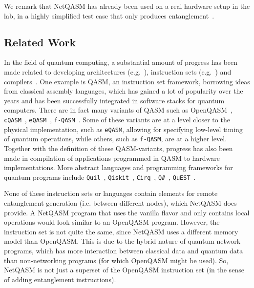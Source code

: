 We remark that \ac{NetQASM} has already been used on a real hardware setup in the lab, in a highly simplified test case that only produces entanglement~\cite{pompili2021experimental}.

\subsection{Related Work}
\label{sec:related}
In the field of quantum computing, a substantial amount of progress has been made related to developing
architectures (e.g.~\cite{fu2017microarchitecture,bourassa2020photonicblueprint, murali2019fullstack, wecker2014liqui, khammassi2020openql, amy2019staq, green2013quipper, Steiger2016}),
instruction sets (e.g.~\cite{cross2017openqasm,khammassi2018cqasm,fu2019eqasm,liu2017fqasm,smith2016quil,qiskit,cirq,qsharp,jones2019quest}) and
compilers~\cite{zulehner2019compiling, haner2018software, gokhale2020quantum, liu2020new, gokhale2020optimized, ding2020square, smith2020opensource, Sivarajah_2020, hietala2019verified, zhang2020contextmapping, niu2020hardware, dury2020qubo, pozzi2020using, Nishio_2020}.
One example is QASM, an instruction set framework, borrowing ideas from classical assembly languages, which has gained a lot of popularity over the years and has been successfully integrated in software stacks for quantum computers.
There are in fact many variants of QASM such as OpenQASM~\cite{cross2017openqasm}, \texttt{cQASM}~\cite{khammassi2018cqasm}, \texttt{eQASM}~\cite{fu2019eqasm}, \texttt{f-QASM}~\cite{liu2017fqasm}.
Some of these variants are at a level closer to the physical implementation, such as \texttt{eQASM}, allowing for specifying low-level timing of quantum operations, while others, such as \texttt{f-QASM}, are at a higher level.
Together with the definition of these QASM-variants, progress has also been made in compilation of applications programmed in QASM to hardware implementations.
More abstract languages and programming frameworks for quantum programs include \texttt{Quil}~\cite{smith2016quil}, \texttt{Qiskit}~\cite{qiskit}, \texttt{Cirq}~\cite{cirq}, \texttt{Q\#}~\cite{qsharp}, \texttt{QuEST}~\cite{jones2019quest}.

None of these instruction sets or languages contain elements for remote entanglement generation (i.e. between different nodes), which \ac{NetQASM} does provide.
A \ac{NetQASM} program that uses the vanilla flavor and only contains local operations would look similar to an OpenQASM program.
However, the instruction set is not quite the same, since \ac{NetQASM} uses a different memory model than OpenQASM.
This is due to the hybrid nature of quantum network programs, which has more interaction between classical data and quantum data than non-networking programs (for which OpenQASM might be used).
So, \ac{NetQASM} is not just a superset of the OpenQASM instruction set (in the sense of adding entanglement instructions).

